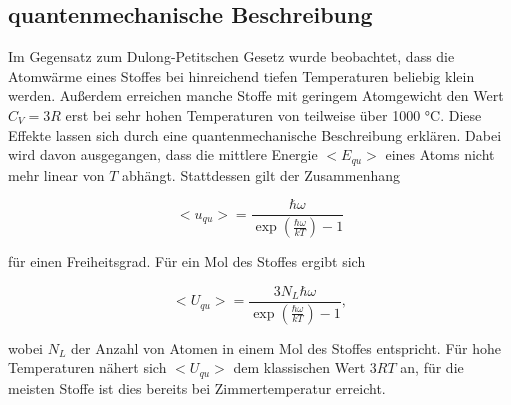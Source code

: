 \subsection{quantenmechanische Beschreibung}
Im Gegensatz zum Dulong-Petitschen Gesetz wurde beobachtet, dass die
Atomwärme eines Stoffes bei hinreichend tiefen Temperaturen beliebig klein werden.
Außerdem erreichen manche Stoffe mit geringem Atomgewicht
den Wert $C_V=3R$ erst bei sehr hohen Temperaturen von
teilweise über 1000 °C. Diese Effekte lassen sich durch eine
quantenmechanische Beschreibung erklären. Dabei wird davon ausgegangen,
dass die mittlere Energie $\bigl< E_{qu}\bigr>$ eines Atoms nicht mehr
linear von $T$ abhängt. Stattdessen gilt der Zusammenhang

\begin{equation}
    \bigl < u_{qu} \bigr > =\frac{\hbar \omega}{\exp(\frac{\hbar \omega }{kT})-1}
\end{equation}

\noindent für einen Freiheitsgrad. Für ein Mol des Stoffes
ergibt sich 

\begin{equation}
    \bigl < U_{qu} \bigr > =\frac{3N_L\hbar \omega}{\exp(\frac{\hbar \omega }{kT})-1},
\end{equation}

\noindent wobei $N_L$ der Anzahl von Atomen in einem Mol des Stoffes entspricht.
Für hohe Temperaturen nähert sich $\bigl < U_{qu} \bigr >$ dem klassischen Wert $3RT$ an,
für die meisten Stoffe ist dies bereits bei Zimmertemperatur erreicht.
